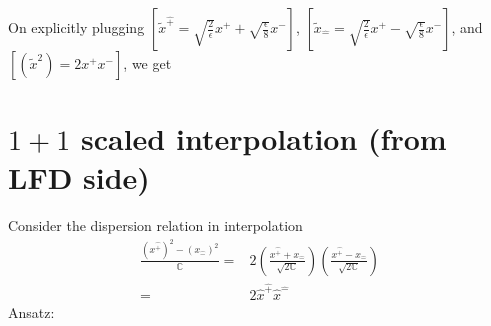\documentclass[]{article}
\numberwithin{equation}{section}
\begin{document}
{{On explicitly plugging $\left[\tilde{x}^{\hat{+}}= \sqrt{\frac{2}{\epsilon}}x^{+} +\sqrt{\frac{\epsilon}{8}}x^{-}\right]$, $\left[\tilde{x}_{\hat{-}}= \sqrt{\frac{2}{\epsilon}}x^{+}  -\sqrt{\frac{\epsilon}{8}}x^{-}\right]$, and $\left[(\tilde{x}^2)=2x^{+}x^{-}\right]$, we get
\begin{table}[h!]
        \centering
        \label{tab:my_label}
\end{table}
\section{$1+1$ scaled interpolation (from LFD side)}
Consider the dispersion relation in interpolation
\begin{align}
    \frac{(x^{\hat{+}})^{2}-(x_{\hat{-}})^{2}}{\mathbb{C}}=&2\left(\frac{x^{\hat{+}}+x_{\hat{-}}}{\sqrt{2\mathbb{C}}}\right)\left(\frac{x^{\hat{+}}-x_{\hat{-}}}{\sqrt{2\mathbb{C}}}\right)\\
    =&2\hat{x}^{\hat{+}}\hat{x}^{\hat{-}}
\end{align}
Ansatz:

}}
\end{document}
